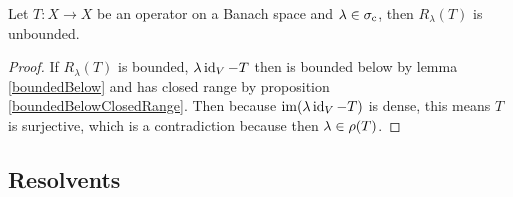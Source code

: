 \begin{proposition}
Let $T:X\to X$ be an operator on a Banach space and $\lambda\in\sigma_\text{c}$, then $R_\lambda(T)$ is unbounded.
\end{proposition}
\begin{proof}
If $R_\lambda(T)$ is bounded, $\lambda \operatorname{id}_V - T$ then is bounded below by lemma \ref{boundedBelow} and has closed range by proposition \ref{boundedBelowClosedRange}. Then because $\operatorname{im}(\lambda \operatorname{id}_V - T)$ is dense, this means $T$ is surjective, which is a contradiction because then $\lambda\in\rho(T)$.
\end{proof}

\subsection{Resolvents}

